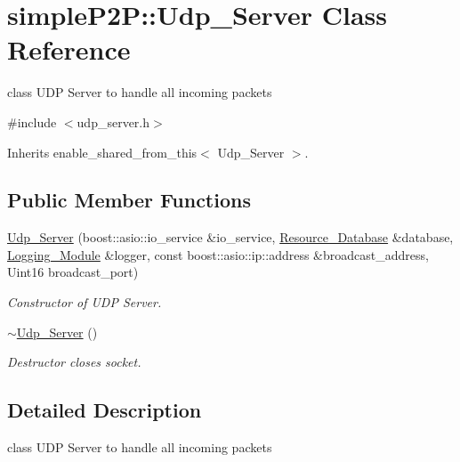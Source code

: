 \hypertarget{classsimpleP2P_1_1Udp__Server}{}\section{simple\+P2P\+:\+:Udp\+\_\+\+Server Class Reference}
\label{classsimpleP2P_1_1Udp__Server}


class U\+DP Server to handle all incoming packets  




{\ttfamily \#include $<$udp\+\_\+server.\+h$>$}



Inherits enable\+\_\+shared\+\_\+from\+\_\+this$<$ Udp\+\_\+\+Server $>$.

\subsection*{Public Member Functions}
\begin{DoxyCompactItemize}
\item 
\hyperlink{classsimpleP2P_1_1Udp__Server_a27116256dba312db65b6736253d059e7}{Udp\+\_\+\+Server} (boost\+::asio\+::io\+\_\+service \&io\+\_\+service, \hyperlink{classsimpleP2P_1_1Resource__Database}{Resource\+\_\+\+Database} \&database, \hyperlink{classsimpleP2P_1_1Logging__Module}{Logging\+\_\+\+Module} \&logger, const boost\+::asio\+::ip\+::address \&broadcast\+\_\+address, Uint16 broadcast\+\_\+port)
\begin{DoxyCompactList}\small\item\em Constructor of U\+DP Server. \end{DoxyCompactList}\item 
\mbox{\label{classsimpleP2P_1_1Udp__Server_adde5307f34477b9bca29f8e2cb9077b0}} 
\hyperlink{classsimpleP2P_1_1Udp__Server_adde5307f34477b9bca29f8e2cb9077b0}{$\sim$\+Udp\+\_\+\+Server} ()
\begin{DoxyCompactList}\small\item\em Destructor closes socket. \end{DoxyCompactList}\end{DoxyCompactItemize}


\subsection{Detailed Description}
class U\+DP Server to handle all incoming packets 

